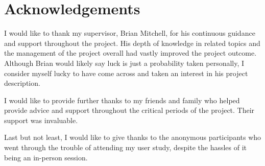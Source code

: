 \section*{Acknowledgements}

I would like to thank my supervisor, Brian Mitchell, for his continuous guidance and support throughout the project. His depth of knowledge in related topics and the management of the project overall had vastly improved the project outcome. Although Brian would likely say luck is just a probability taken personally, I consider myself lucky to have come across and taken an interest in his project description.

I would like to provide further thanks to my friends and family who helped provide advice and support throughout the critical periods of the project. Their support was invaluable.

Last but not least, I would like to give thanks to the anonymous participants who went through the trouble of attending my user study, despite the hassles of it being an in-person session.